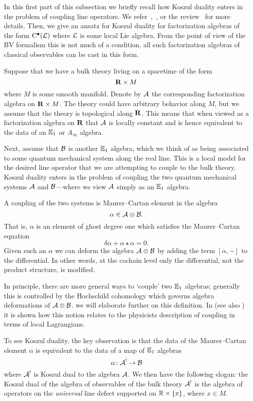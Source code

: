 In this first part of this subsection we briefly recall how Koszul duality enters in the problem of coupling line operators. 
We refer~\cite[\S 6]{CP1},~\cite[\S ??]{CG1}, or the review~\cite{PWkoszul} for more details. 
Then, we give an ansatz for Koszul duality for factorization algebras of the form ${\rm C}^\bullet(\mathcal L)$ where $\mathcal L$ is some local Lie algebra. 
From the point of view of the BV formalism this is not much of a condition, all such factorization algebras of classical observables can be cast in this form. 

\parsec[s:lines]
Suppose that we have a bulk theory living on a spacetime of the form 
\[
\mathbf{R} \times M 
\]
where $M$ is some smooth manifold. 
Denote by $\mathcal A$ the corresponding factorization algebra on $\mathbf{R} \times M$. 
The theory could have arbitrary behavior along $M$, but we assume that the theory is topological along $\mathbf{R}$. 
This means that when viewed as a factorization algebra on $\mathbf{R}$ that $\mathcal A$ is locally constant and is hence equivalent to the data of an $\mathbb E_1$ or $A_\infty$ algebra.

Next, assume that $\mathcal B$ is another $\mathbb E_1$ algebra, which we think of as being associated to some quantum mechanical system along the real line.
This is a local model for the desired line operator that we are attempting to couple to the bulk theory.
Koszul duality enters in the problem of coupling the two quantum mechanical systems $\mathcal A$ and $\mathcal B$---where we view $\mathcal A$ simply as an $\mathbb E_1$ algebra. 

A coupling of the two systems is Maurer--Cartan element in the algebra
\[
\alpha \in \mathcal A \otimes \mathcal B .
\]
That is, $\alpha$ is an element of ghost degree one which satisfies the Maurer--Cartan equation
\[
\delta \alpha + \alpha \star \alpha = 0 .
\]
Given such an $\alpha$ we can deform the algebra $\mathcal A \otimes \mathcal B$ by adding the term $[\alpha,-]$ to the differential. 
In other words, at the cochain level only the differential, not the product structure, is modified. 

In principle, there are more general ways to `couple' two $\mathbb E_1$ algebras; generally this is controlled by the Hochschild cohomology which governs algebra deformations of $\mathcal A \otimes \mathcal B$. 
we will elaborate further on this definition. 
In \cite{CG1} (see also \cite{PWkoszul}) it is shown how this notion relates to the physicists description of coupling in terms of local Lagrangians.

To see Koszul duality, the key observation is that the data of the Maurer--Cartan element $\alpha$ is equivalent to the data of a map of $\mathbb E_1$ algebras
\[
\alpha \colon \mathcal A^! \to \mathcal B 
\]
where $\mathcal A^!$ is Koszul dual to the algebra $\mathcal A$. 
We then have the following slogan: the Koszul dual of the algebra of observables of the bulk theory $\mathcal A^!$ is the algebra of operators on the {\em universal} line defect supported on $\mathbb R \times \{x\}$, where $x \in M$.  

